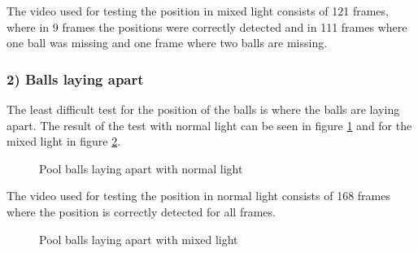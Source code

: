 The video used for testing the position in mixed light consists of 121 frames, where in 9 frames the positions were correctly detected and in 111 frames where one ball was missing and one frame where two balls are missing.

\subsubsection{ 2) Balls laying apart}
The least difficult test for the position of the balls is where the balls are laying apart. The result of the test with normal light can be seen in figure \ref{fig:apartnormal} and for the mixed light in figure \ref{fig:apartmixed}.

\begin{figure}[H]
  \centering
\quad
\quad
   \caption{Pool balls laying apart with normal light}
  \label{fig:apartnormal}
\end{figure}

The video used for testing the position in normal light consists of 168 frames where the position is correctly detected for all frames.

\begin{figure}[H]
  \centering
\quad
\quad
   \caption{Pool balls laying apart with mixed light}
  \label{fig:apartmixed}
\end{figure}

